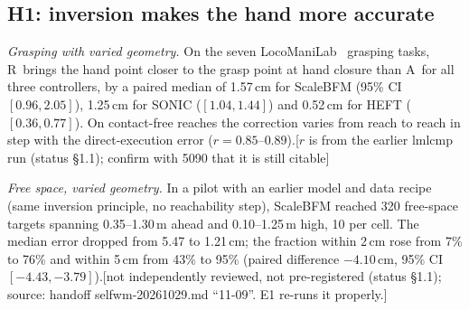 \documentclass[conference]{IEEEtran}
\newif\ifdraft \drafttrue
\newcommand{\dnote}[1]{\ifdraft{\color{red}\footnotesize[#1]}\fi}
\newcommand{\Ad}{\textsc{A}}   %
\newcommand{\Rr}{\textsc{R}}   %
\begin{document}
\subsection{H1: inversion makes the hand more accurate}
\emph{Grasping with varied geometry.} On the seven LocoManiLab~\cite{locomanilab} grasping tasks, \Rr\ brings the hand point closer to the grasp point at hand closure than \Ad\ for all three controllers, by a paired median of 1.57\,cm for ScaleBFM (95\% CI $[0.96,2.05]$), 1.25\,cm for SONIC ($[1.04,1.44]$) and 0.52\,cm for HEFT ($[0.36,0.77]$). On contact-free reaches the correction varies from reach to reach in step with the direct-execution error ($r=0.85$--$0.89$).\dnote{$r$ is from the earlier lmlcmp run (status §1.1); confirm with 5090 that it is still citable}

\emph{Free space, varied geometry.} In a pilot with an earlier model and data recipe (same inversion principle, no reachability step), ScaleBFM reached 320 free-space targets spanning 0.35--1.30\,m ahead and 0.10--1.25\,m high, 10 per cell. The median error dropped from 5.47 to 1.21\,cm; the fraction within 2\,cm rose from 7\% to 76\% and within 5\,cm from 43\% to 95\% (paired difference $-4.10$\,cm, 95\% CI $[-4.43,-3.79]$).\dnote{not independently reviewed, not pre-registered (status §1.1); source: handoff selfwm-20261029.md ``11-09''. E1 re-runs it properly.}
\end{document}
